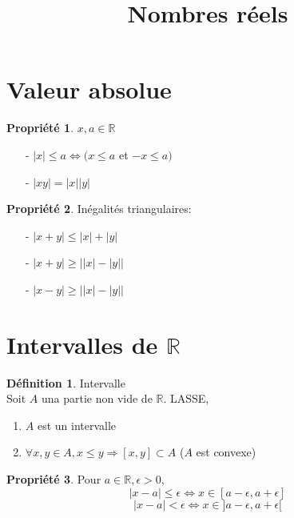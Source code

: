 \documentclass[fleqn]{article}
\title{Nombres r\'eels}
\date{}
\theoremstyle{definition} \newtheorem*{defi}{D\'efinition}
\theoremstyle{definition} \newtheorem*{theo}{Th\'eor\`eme}
\theoremstyle{definition} \newtheorem*{coro}{Corollaire}
\theoremstyle{remark} \newtheorem*{rqs}{Remarques}
\theoremstyle{definition} \newtheorem*{prop}{Propri\'et\'e}
\begin{document}
\maketitle

\section{Valeur absolue}
\begin{prop} $x,a \in \mathbb{R}$
	\begin{itemize}
		\item [-] $|x| \leq a \Leftrightarrow (x \leq a$ et $-x \leq a)$
		\item [-] $|xy| = |x||y|$
	\end{itemize}
\end{prop}
\begin{prop} In\'egalit\'es triangulaires:
	\begin{itemize}
		\item [-] $|x+y| \leq |x| + |y|$
		\item [-] $|x+y| \geq \big||x| - |y|\big|$
		\item [-] $|x-y| \geq \big||x| - |y|\big|$
	\end{itemize}
\end{prop}

\section{Intervalles de $\mathbb{R}$}
\begin{defi} Intervalle \\
	Soit $A$ una partie non vide de $\mathbb{R}$. LASSE,
	\begin{enumerate}
		\item $A$ est un intervalle
		\item $\forall x,y \in A, x \leq y \Rightarrow [x,y] \subset A$ ($A$ est convexe)
	\end{enumerate}
\end{defi}
\begin{prop}
	Pour $a \in \mathbb{R}, \epsilon > 0$,
	\[|x-a| \leq \epsilon \Leftrightarrow x \in [a - \epsilon, a + \epsilon]\]
	\[|x-a| < \epsilon \Leftrightarrow x \in ]a - \epsilon, a + \epsilon[\]
\end{prop}
\end{document}
